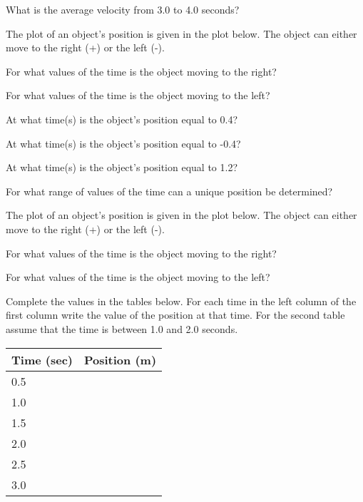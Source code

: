 \begin{problem}
\begin{subproblem}
    \item What is the average velocity from 3.0 to 4.0  seconds?
      \vspace{3em}
    \end{subproblem}

    \clearpage

  \item The plot of an object's position is given in the plot
    below. The object can either move to the right (+) or the left
    (-).

    \scalebox{0.4}{}

    \begin{subproblem}
    \item For what values of the time is the object moving to the
      right?
      \vfill
    \item For what values of the time is the object moving to the
      left?
      \vfill
    \item At what time(s) is the object's position equal to 0.4?
      \vfill
    \item At what time(s) is the object's position equal to -0.4?
      \vfill
    \item At what time(s) is the object's position equal to 1.2?
      \vfill
    \item For what range of values of the time can a unique position
      be determined?
      \vfill
    \end{subproblem}

    \clearpage

  \item The plot of an object's position is given in the plot
    below. The object can either move to the right (+) or the left
    (-).

    \scalebox{0.4}{}

\begin{subproblem}
  \item For what values of the time is the object moving to the
    right?
    \vfill
  \item For what values of the time is the object moving to the
    left?
    \vfill
  \item     Complete the values in the tables below. For each time in the left
      column of the first column write the value of the position at that
      time. For the second table assume that the time is between 1.0 and
      2.0 seconds.

      \begin{tabular}{l|l}
        Time (sec) & Position (m) \\ \hline
        0.5 & \\ [12pt]
        1.0 & \\  [12pt]
        1.5 & \\  [12pt]
        2.0 & \\  [12pt]
        2.5 & \\  [12pt]
        3.0
      \end{tabular}


\end{subproblem}
\end{problem}
